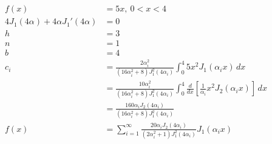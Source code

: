 \documentclass{article}
\begin{document}
\begin{align*}
  f(x)                                      & = 5 x,\ 0 < x < 4                                                                                                                                \\
  4 J_1(4 \alpha) + 4 \alpha J_1'(4 \alpha) & = 0                                                                                                                                              \\
  h                                         & = 3                                                                                                                                              \\
  n                                         & = 1                                                                                                                                              \\
  b                                         & = 4                                                                                                                                              \\
  c_i                                       & = \frac{2 \alpha_i^2}{(16 \alpha_i^2 + 8) J_1^2(4 \alpha_i)} \int_0^4 5 x^2 J_1(\alpha_i x) \,d x                                                \\
                                            & = \frac{10 \alpha_i^2}{(16 \alpha_i^2 + 8) J_1^2(4 \alpha_i)} \int_0^4 \frac{d}{d x} \left[ \frac{1}{\alpha_i} x^2 J_2(\alpha_i x) \right] \,d x \\
                                            & = \frac{160 \alpha_i J_2(4 \alpha_i)}{(16 \alpha_i^2 + 8) J_1^2(4 \alpha_i)}                                                                     \\
  f(x)                                      & = \sum_{i = 1}^\infty \frac{20 \alpha_i J_2(4 \alpha_i)}{(2 \alpha_i^2 + 1) J_1^2(4 \alpha_i)} J_1(\alpha_i x)
\end{align*}

\setcounter{subsubsection}{14}
\subsubsection{}
\end{document}

